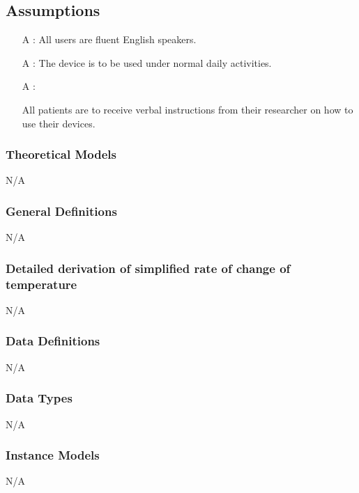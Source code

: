 \documentclass[12pt]{article}
\newcounter{assumpnum} %
\begin{document}
\subsection{Assumptions}%

\begin{itemize}

\item[A\refstepcounter{assumpnum}\theassumpnum
\label{A1}:]
{All users are fluent English speakers.}

\item[A\refstepcounter{assumpnum}\theassumpnum
\label{A2}:]
{The device is to be used under normal daily activities.}

\item[A\refstepcounter{assumpnum}\theassumpnum
\label{A3}:]

{All patients are to receive verbal instructions from their researcher on how to use their devices.}

\end{itemize}


\subsubsection{Theoretical Models}\label{sec_theoretical}
N/A

\subsubsection{General Definitions}\label{sec_gendef}
N/A
\subsubsection*{Detailed derivation of simplified rate of change of temperature}
N/A

\subsubsection{Data Definitions}\label{sec_datadef}
N/A

\subsubsection{Data Types}\label{sec_datatypes}


N/A



\subsubsection{Instance Models} \label{sec_instance}
N/A
\end{document}
